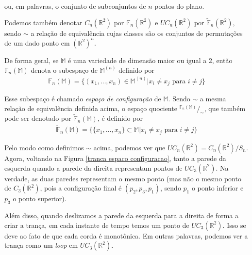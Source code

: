 	\par\vspace{0.3cm} ou, em palavras, o conjunto de subconjuntos de $n$ pontos do plano. 
	\par\vspace{0.3cm} Podemos também denotar $C_n(\mathbb{R}^2)$ por $\mathbb{F}_n(\mathbb{R}^2)$ e $UC_n(\mathbb{R}^2)$ por $\widetilde{\mathbb{F}}_n(\mathbb{R}^2)$, sendo $\sim$ a relação de equivalência cujas classes são os conjuntos de permutações de um dado ponto em $(\mathbb{R}^2)^n$. 
	\par\vspace{0.3cm} De forma geral, se $\mathbb{M}$ é uma variedade de dimensão maior ou igual a 2, então $\mathbb{F}_n(\mathbb{M})$ denota o subespaço de $\mathbb{M}^{(n)}$ definido por
	\begin{align}
	\mathbb{F}_n(\mathbb{M}) = \{ (x_1, \dots, x_n)\in \mathbb{M}^{(n)} | x_i\neq x_j \text{ para }i\neq j \} 
	\label{espaco de configuracao de M}
	\end{align}
	\par\vspace{0.3cm} Esse subespaço é chamado \textit{espaço de configuração} de $\mathbb{M}$. Sendo $\sim$ a mesma relação de equivalência definida acima, o espaço quociente $^{\displaystyle{\mathbb{F}_n(\mathbb{M})}}/_{\sim}$, que também pode ser denotado por $\widetilde{\mathbb{F}}_n(\mathbb{M})$, é definido por
	\begin{align}
	\widetilde{\mathbb{F}}_n(\mathbb{M}) = \{ \{ x_1, \dots, x_n\}\subset\mathbb{M}| x_i\neq x_j \text{ para }i\neq j  \}\label{espaco de configuracao nao ordenado de M}
	\end{align} 
	\par\vspace{0.3cm} Pelo modo como definimos $\sim$ acima, podemos ver que $UC_n(\mathbb{R}^2) = \displaystyle{C_n(\mathbb{R}^2)}/\displaystyle{S_n}$. Agora, voltando na Figura \eqref{tranca espaco configuracao}, tanto a parede da esquerda quando a parede da direita representam pontos de $UC_3(\mathbb{R}^2)$. Na verdade, as duas paredes representam o mesmo ponto (mas não o mesmo ponto de $C_3(\mathbb{R}^2)$, pois a configuração final é $(p_2, p_3, p_1)$, sendo $p_1$ o ponto inferior e $p_3$ o ponto superior). 
	\par\vspace{0.3cm} Além disso, quando deslizamos a parede da esquerda para a direita de forma a criar a trança, em cada instante de tempo temos um ponto de $UC_3(\mathbb{R}^2)$. Isso se deve ao fato de que cada corda é monotônica. Em outras palavras, podemos ver a trança como um \textit{loop} em $UC_3(\mathbb{R}^2)$.
